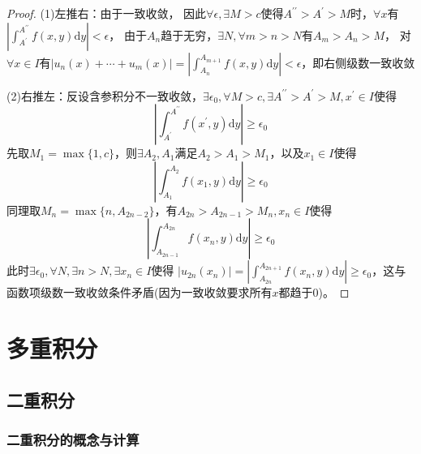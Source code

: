 \begin{proof}
  (1)左推右：由于一致收敛，
  因此$\forall \epsilon, \exists M > c$使得$A^{\prime\prime} > A^{\prime} > M$时，$\forall x$有
  $|\int^{A^{\prime\prime}}_{A^{\prime}} f(x,y)\mathrm{d}y| < \epsilon$，
  由于$A_n$趋于无穷，$\exists N, \forall m>n>N$有$A_m > A_n >M$，
  对$\forall x \in I$有$|u_n(x) + \cdots + u_m(x)| = |\int_{A_n}^{A_{m+1}}f(x,y)\mathrm{d}y| < \epsilon$，即右侧级数一致收敛

  (2)右推左：反设含参积分不一致收敛，$\exists \epsilon_0, \forall M > c, \exists A^{\prime\prime} > A^{\prime} > M, x^{\prime} \in I$使得
  \begin{equation*}
    \left|\int^{A^{\prime\prime}}_{A^{\prime}}f(x^{\prime},y)\mathrm{d}y\right| \geq \epsilon_0
  \end{equation*}
  先取$M_1 = \max \{1, c\}$，则$\exists A_2, A_1$满足$A_2 > A_1 > M_1$，以及$x_1 \in I$使得
  \begin{equation*}
    \left| \int_{A_1}^{A_2}f(x_1,y)\mathrm{d} y \right| \geq \epsilon_0
  \end{equation*}
  同理取$M_n = \max \{n, A_{2n - 2}\}$，有$A_{2n} > A_{2n - 1} > M_n, x_n \in I$使得
  \begin{equation*}
    \left|\int^{A_{2n}}_{A_{2n-1}}f(x_n,y)\mathrm{d}y\right| \geq \epsilon_0
  \end{equation*}
  此时$\exists \epsilon_0, \forall N, \exists n > N, \exists x_n \in I$使得
  $|u_{2n}(x_n)| = |\int^{A_{2n+1}}_{A_{2n}} f(x_n,y)\mathrm{d}y| \geq \epsilon_0$，这与函数项级数一致收敛条件矛盾(因为一致收敛要求所有$x$都趋于$0$)。
\end{proof}













\newpage


\chapter{多重积分}


\section{二重积分}

\subsection{二重积分的概念与计算}


